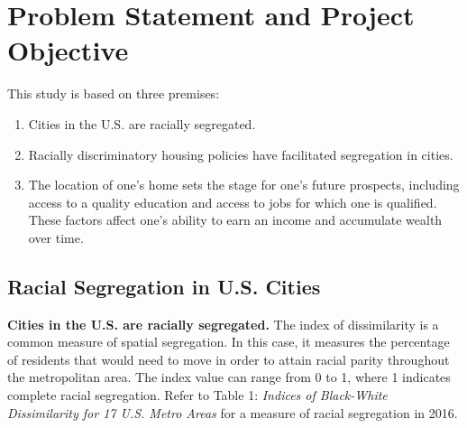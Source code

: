 \documentclass[paper=letter, fontsize=12pt]{scrartcl} %
\begin{document}
\section{Problem Statement and Project Objective}
This study is based on three premises:
\begin{enumerate}
	\item Cities in the U.S. are racially segregated.
	\item Racially discriminatory housing policies have facilitated segregation in cities.
	\item The location of one's home sets the stage for one's future prospects, including access to a quality education and access to jobs for which one is qualified. These factors affect one's ability to earn an income and accumulate wealth over time.
\end{enumerate}

\subsection{Racial Segregation in U.S. Cities}
\textbf{Cities in the U.S. are racially segregated.} The index of dissimilarity is a common measure of spatial segregation. In this case, it measures the percentage of residents that would need to move in order to attain racial parity throughout the metropolitan area. The index value can range from 0 to 1, where 1 indicates complete racial segregation. \cite{duncan} Refer to Table 1: \textit{Indices of Black-White Dissimilarity for 17 U.S. Metro Areas} for a measure of racial segregation in 2016.\par
\end{document}

